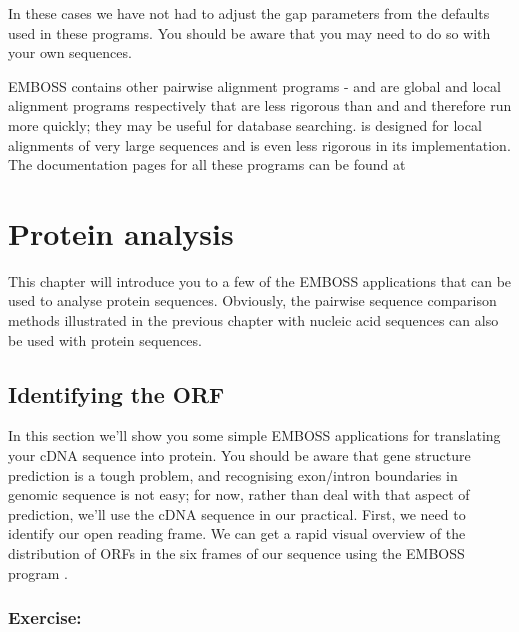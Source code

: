 \documentclass[12pt]{report}
\begin{document}
In these cases we have not had to adjust the gap parameters from the
defaults used in these programs. You should be aware that you may need
to do so with your own sequences.

 EMBOSS	contains other pairwise	alignment programs - 
 and  are global	and local alignment programs respectively that are
 less rigorous than  and  and therefore run
 more quickly; they may	be useful for database
 searching.  is designed for local alignments of
 very large sequences and is even less rigorous	in its
 implementation. The documentation pages for all these programs	can be
 found at\\

\chapter{Protein analysis}

This chapter will introduce you	to a few of the	EMBOSS applications that can be	used to	analyse	protein	sequences. Obviously, the
pairwise sequence comparison methods illustrated in the	previous
chapter	with nucleic acid sequences can	also be	used with protein
sequences.

\section{Identifying the ORF}
In this	section	we'll show you some simple EMBOSS applications for
translating your cDNA sequence into protein. You should	be aware that
gene structure prediction is a tough problem, and recognising exon/intron
boundaries in genomic sequence is not easy; for	now, rather than deal
with that aspect of prediction,	we'll use the cDNA sequence in our
practical. First, we need to identify our open reading frame. We can
get a rapid visual overview of the distribution	of ORFs	in the six
frames of our sequence using the EMBOSS	program	.

\subsection*{Exercise: }

\unix{}\\
\\
\\
\end{document}
